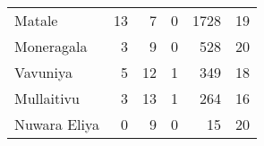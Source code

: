\begin{tabular}{lrrrrr}
Matale       &          13 &           7 &            0 &             1728 &          19 \\
Moneragala   &           3 &           9 &            0 &              528 &          20 \\
Vavuniya     &           5 &          12 &            1 &              349 &          18 \\
Mullaitivu   &           3 &          13 &            1 &              264 &          16 \\
Nuwara Eliya &           0 &           9 &            0 &               15 &          20 \\
\bottomrule
\end{tabular}
